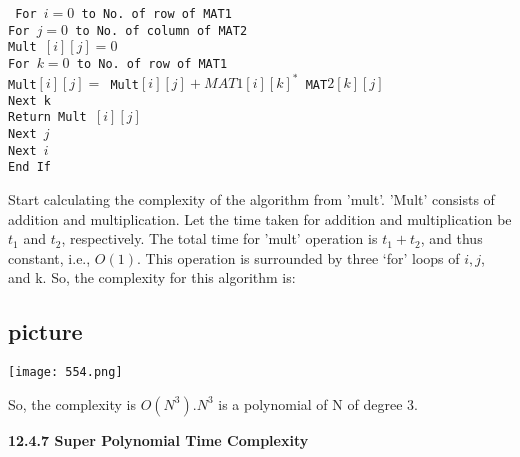 \documentclass[12pt]{article}
\begin{document}
\texttt{
\hspace*{2.5cm} For $i = 0$ to No. of row of MAT1 \\
\hspace*{3cm} For $j = 0$ to No. of column of MAT2 \\
\hspace*{3.5cm} Mult $[i][j] = 0$ \\
\hspace*{3.5cm} For $k = 0$ to No. of row of MAT1 \\
\hspace*{4cm} Mult$[i][j]=$ Mult$[i][j] + MAT1[i][k] ^{*}$ MAT$2[k][j]$ \\
\hspace*{3.5cm} Next k \\
\hspace*{4cm} Return Mult $[i][j]$ \\
\hspace*{3cm} Next $j$ \\
\hspace*{2.5cm} Next $i$ \\
\hspace*{2cm} End If \\
}

\hspace*{0.5cm} Start calculating the complexity of the algorithm from 'mult'. 'Mult' consists of addition and multiplication.
Let the time taken for addition and multiplication be $t_1$ and $t_2$, respectively. The total time for
'mult' operation is $t_1+t_2$, and thus constant, i.e., $O(1)$. This operation is surrounded by three ‘for’ loops
of $i, j$, and k. So, the complexity for this algorithm is:\\

\begin{center}
\section{picture}
\texttt{[image: 554.png]}
\end{center}

\hspace*{0.5cm} So, the complexity is $O(N^{3}). N^{3}$ is a polynomial of N of degree 3.\\

\vspace*{0.5cm}

\large{
\textbf{12.4.7 Super Polynomial Time Complexity}\\
}
\end{document}
